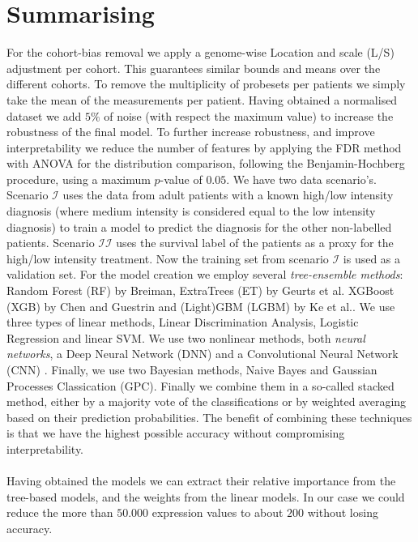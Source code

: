 \documentclass[a4paper,10pt]{article}
\begin{document}
\section{Summarising}
%
For the cohort-bias removal we apply a genome-wise Location and scale (L/S) adjustment per cohort. This guarantees
similar bounds and means over the different cohorts. To remove the multiplicity of probesets per patients
we simply take the mean of the measurements per patient. Having obtained a normalised dataset we add $5\%$
of noise (with respect the maximum value) to increase the robustness of the final model. To further increase robustness, and improve 
interpretability we reduce the number of features by applying the FDR method with ANOVA for the distribution comparison, 
following the Benjamin-Hochberg procedure, using a maximum $p$-value of $0.05$. 
%
We have two data scenario's. Scenario $\mathcal{I}$ uses the data from adult patients with a known high/low intensity diagnosis (where 
medium intensity is considered equal to the low intensity diagnosis) to train a model to predict the diagnosis for the other non-labelled patients.
Scenario $\mathcal{II}$ uses the survival label of the patients as a proxy for the high/low intensity treatment. Now the training set from scenario
$\mathcal{I}$ is used as a validation set.
%
For the model creation we employ several \textit{tree-ensemble methods}: Random Forest (RF) by Breiman\cite{Breiman2001}, ExtraTrees (ET) by Geurts et al.\cite{Geurts2006} 
XGBoost (XGB) by Chen and Guestrin\cite{Chen2016} and (Light)GBM (LGBM) by Ke et al.\cite{Ke2017}. 
We use three types of linear methods, Linear Discrimination Analysis, Logistic Regression and linear SVM.
We use two nonlinear methods, both \textit{neural networks}, a Deep Neural Network (DNN) \cite{lecun2015deep} and a Convolutional Neural Network (CNN) \cite{Lecun98}.
Finally, we use two Bayesian methods, Naive Bayes and Gaussian Processes Classication (GPC).
%
Finally we combine them in a so-called stacked method, either by a majority vote of the classifications or by weighted averaging based on their prediction probabilities.
The benefit of combining these techniques is that we have the highest possible accuracy without compromising interpretability. \\ \\
%
Having obtained the models we can extract their relative importance from the tree-based models, and the weights from the linear models.
In our case we could reduce the more than $50.000$ expression values to about $200$ without losing accuracy. 
%
\end{document}
